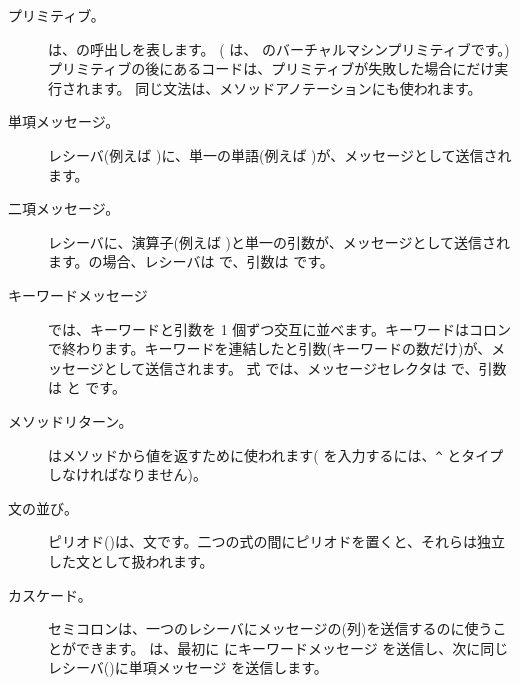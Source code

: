 \documentclass[a4paper,10pt,twoside]{book}
\begin{document}
\begin{description}
\item[プリミティブ。] は、の呼出しを表します。
	( は、 のバーチャルマシンプリミティブです。)
	プリミティブの後にあるコードは、プリミティブが失敗した場合にだけ実行されます。
	同じ文法は、メソッドアノテーションにも使われます。

\item[単項メッセージ。] レシーバ(例えば )に、単一の単語(例えば )が、メッセージとして送信されます。

\item[二項メッセージ。] レシーバに、演算子(例えば \ct{+})と単一の引数が、メッセージとして送信されます。の場合、レシーバは  で、引数は  です。

\item[キーワードメッセージ] では、キーワードと引数を 1 個ずつ交互に並べます。キーワードはコロンで終わります。キーワードを連結したと引数(キーワードの数だけ)が、メッセージとして送信されます。
式  では、メッセージセレクタは  で、引数は  と  です。

\item[メソッドリターン。] \ct{^}はメソッドから値を返すために使われます(\ct{^} を入力するには、\verb|^| とタイプしなければなりません)。

\item[文の並び。] ピリオド()は、文です。二つの式の間にピリオドを置くと、それらは独立した文として扱われます。

\item[カスケード。] セミコロンは、一つのレシーバにメッセージの(列)を送信するのに使うことができます。 は、最初に  にキーワードメッセージ  を送信し、次に同じレシーバ()に単項メッセージ  を送信します。

\end{description}
\end{document}
